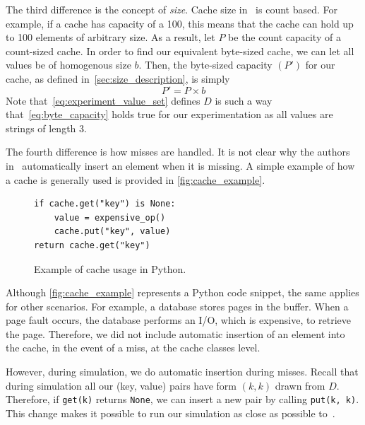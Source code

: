 The third difference is the concept of \textit{size}.
Cache size in~\cite{shah2023ImprovedCacheEviction}
is count based. For example, if a cache has capacity of a 100,
this means that the cache can hold up to 100 elements of
arbitrary size. As a result, let $P$ be the count capacity
of a count-sized cache. In order to find our equivalent byte-sized
cache, we can let all values be of homogenous size $b$.
Then, the byte-sized capacity $(P')$ for our cache, as defined
in~\ref{sec:size_description}, is simply
\begin{equation}
    P' = P \times b
    \label{eq:byte_capacity}
\end{equation}
Note that~\autoref{eq:experiment_value_set} defines $D$ is such a way
that~\autoref{eq:byte_capacity} holds true for our experimentation
as all values are strings of length 3.

The fourth difference is how misses are handled.
It is not clear why the
authors in~\cite{shah2023ImprovedCacheEviction}
automatically insert an element when it is missing.
A simple example of how a cache
is generally used is provided in \autoref{fig:cache_example}.

\begin{figure}[ht]
    \centering
    \begin{tcolorbox}[colback=gray!5!white, colframe=gray!75!black, title=General Cache Example]
    \begin{verbatim}
if cache.get("key") is None:
    value = expensive_op()
    cache.put("key", value)
return cache.get("key")
    \end{verbatim}
    \end{tcolorbox}
    \caption{Example of cache usage in Python.}
    \label{fig:cache_example}
\end{figure}

Although \autoref{fig:cache_example}
represents a Python code snippet, the same
applies for other scenarios. For example,
a database stores pages in the buffer. When a
page fault
occurs, the database performs an I/O, which
is expensive, to retrieve the page.
Therefore, we did not include automatic
insertion of an element into the cache, in
the event of a miss, at the cache classes level.

However, during simulation, we do automatic insertion
during misses. Recall that during simulation
all our (key, value) pairs have form $(k, k)$
drawn from $D$.
Therefore, if \texttt{get(k)} returns \texttt{None},
we can insert a new pair by calling \texttt{put(k, k)}.
This change makes it possible to run our simulation
as close as possible to~\cite{shah2023ImprovedCacheEviction}.

